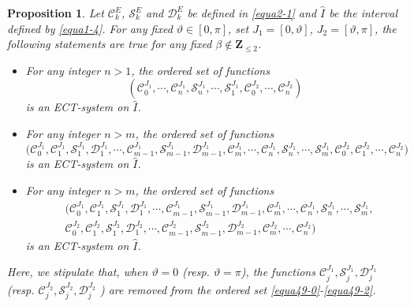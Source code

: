 \documentclass[11pt]{amsart}
\newtheorem{prop}[thm]{Proposition}
\theoremstyle{remark}
\theoremstyle{definition}
\begin{document}
\begin{prop} \label{prop3-5} Let $\mathcal{C}_{k}^{E}$, $\mathcal{S}_{k}^{E}$ and $\mathcal{D}_{k}^{E}$   be defined in \eqref{equa2-1} and $\hat{I}$ be the   interval   defined by  \eqref{equa1-4}. For any fixed   $\vartheta\in [0, \pi]$, set $J_1=[0, \vartheta]$, $J_2=[\vartheta, \pi]$,
the following statements are true for any fixed $\beta \notin \mathbf{Z}_{\leq 2}$.
\begin{itemize}
\item [(i)] For any integer $n>1$, the ordered set of functions
\begin{equation} \label{equa49-0}\left(\mathcal{C}_{0}^{J_1}, \cdots, \mathcal{C}_{n}^{J_1}, \mathcal{S}_{n}^{J_1}, \cdots, \mathcal{S}_{1}^{J_1},\mathcal{C}_{0}^{J_2}, \cdots, \mathcal{C}_{n}^{J_2}\right) \end{equation}
is an ECT-system on   $\hat{I}$.
\item [(ii)] For any integer $n>m$, the ordered set of functions\begin{equation} \label{equa49-1}\bigg(\mathcal{C}_{0}^{J_1}, \mathcal{C}_{1}^{J_1}, \mathcal{S}_{1}^{J_1}, \mathcal{D}_{1}^{J_1}, \cdots, \mathcal{C}_{m-1}^{J_1}, \mathcal{S}_{m-1}^{J_1}, \mathcal{D}_{m-1}^{J_1},
  \mathcal{C}_{m}^{J_1}, \cdots, \mathcal{C}_{n}^{J_1}, \mathcal{S}_{n}^{J_1}, \cdots, \mathcal{S}_{m}^{J_1},\mathcal{C}_{0}^{J_2}, \mathcal{C}_{1}^{J_2},  \cdots, \mathcal{C}_{n}^{J_2}\bigg)
  \end{equation}
is an ECT-system on  $\hat{I}$.
\item [(iii)]  For any integer $n>m$, the ordered set of functions
\begin{equation} \label{equa49-2}\begin{split}&\bigg(\mathcal{C}_{0}^{J_1}, \mathcal{C}_{1}^{J_1}, \mathcal{S}_{1}^{J_1}, \mathcal{D}_{1}^{J_1},  \cdots, \mathcal{C}_{m-1}^{J_1}, \mathcal{S}_{m-1}^{J_1}, \mathcal{D}_{m-1}^{J_1}, \mathcal{C}_{m}^{J_1}, \cdots, \mathcal{C}_{n}^{J_1}, \mathcal{S}_{n}^{J_1}, \cdots, \mathcal{S}_{m}^{J_1},\\
&\mathcal{C}_{0}^{J_2}, \mathcal{C}_{1}^{J_2}, \mathcal{S}_{1}^{J_2}, \mathcal{D}_{1}^{J_2},\cdots, \mathcal{C}_{m-1}^{J_2}, \mathcal{S}_{m-1}^{J_2}, \mathcal{D}_{m-1}^{J_2}, \mathcal{C}_{m}^{J_2}, \cdots, \mathcal{C}_{n}^{J_2}\bigg)
 \end{split}  \end{equation}
is an ECT-system on  $\hat{I}$.
\end{itemize}
Here,  we stipulate that, when  $\vartheta=0$ (resp. $\vartheta=\pi$), the functions $\mathcal{C}_{j}^{J_1}, \mathcal{S}_{j}^{J_1}, \mathcal{D}_{j}^{J_1}$ (resp. $\mathcal{C}_{j}^{J_2}, \mathcal{S}_{j}^{J_2}, \mathcal{D}_{j}^{J_2}$ ) are removed from  the ordered set \eqref{equa49-0}-\eqref{equa49-2}.
\end{prop}
\end{document}
